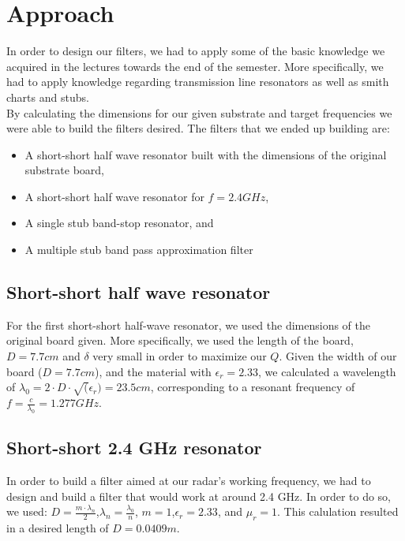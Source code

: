 \documentclass[letterpaper, 12pt]{article}
\begin{document}
\section{Approach}
In order to design our filters, we had to apply some of the basic knowledge we acquired in the lectures towards the end of the semester. More specifically, we had to apply knowledge regarding transmission line resonators as well as smith charts and stubs.
\\
By calculating the dimensions for our given substrate and target frequencies we were able to build the filters desired. The filters that we ended up building are:
\begin{itemize}
    \item A short-short half wave resonator built with the dimensions of the original substrate board,
    \item A short-short half wave resonator for $f=2.4 GHz$,
    \item A single stub band-stop resonator, and
    \item A multiple stub band pass approximation filter
\end{itemize}
\subsection{Short-short half wave resonator}
For the first short-short half-wave resonator, we used the dimensions of the original board given. More specifically, we used the length of the board, $D=7.7cm$ and $\delta$ very small in order to maximize our $Q$. Given the width of our board ($D=7.7cm$), and the material with $\epsilon_r=2.33$, we calculated a wavelength of \(\lambda_0=2\cdot D \cdot\sqrt(\epsilon_r)=23.5cm\), corresponding to a resonant frequency of $f=\frac{c}{\lambda_0}=1.277GHz$.

\subsection{Short-short 2.4 GHz resonator}
In order to build a filter aimed at our radar's working frequency, we had to design and build a filter that would work at around 2.4 GHz. In order to do so, we used: \(D=\frac{m\cdot\lambda_n}{2}\),\(\lambda_n=\frac{\lambda_0}{n}\), \(m=1\),\(\epsilon_r=2.33\), and \(\mu_r=1\). This calulation resulted in a desired length of \(D=0.0409m\).
\end{document}

